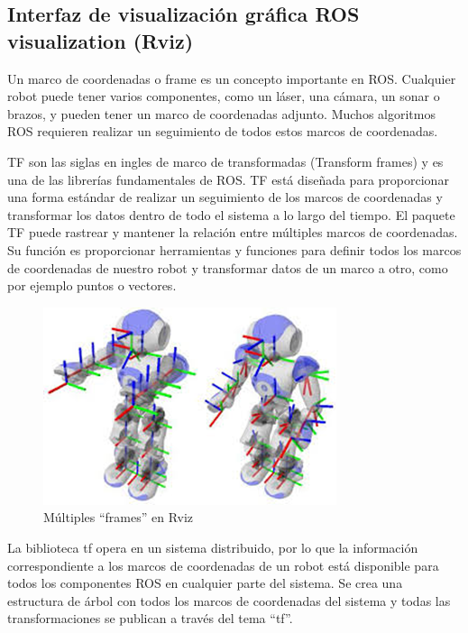         \newpage
    
    \subsection{Interfaz de visualización gráfica ROS visualization (Rviz)}
    
        Un marco de coordenadas o frame es un concepto importante en ROS. Cualquier robot puede tener varios componentes, como un láser, una cámara, un sonar o brazos, y pueden tener un marco de coordenadas adjunto. Muchos algoritmos ROS requieren realizar un seguimiento de todos estos marcos de coordenadas.
        
        TF son las siglas en ingles de marco de transformadas (Transform frames) y es una de las librerías fundamentales de ROS. TF está diseñada para proporcionar una forma estándar de realizar un seguimiento de los marcos de coordenadas y transformar los datos dentro de todo el sistema a lo largo del tiempo. El paquete TF puede rastrear y mantener la relación entre múltiples marcos de coordenadas. Su función es proporcionar herramientas y funciones para definir todos los marcos de coordenadas de nuestro robot y transformar datos de un marco a otro, como por ejemplo puntos o vectores.
        
        \begin{figure}[htb]
            \centering
            \includegraphics[width=0.5\linewidth]{Main/Chapter3/Images3/3-6/ejemplo-multiples-frames-rviz.png}
            \caption{Múltiples ``frames'' en Rviz}
            \label{f:Cap3-6_frames_rviz}
        \end{figure}
        
        La biblioteca tf opera en un sistema distribuido, por lo que la información correspondiente a los marcos de coordenadas de un robot está disponible para todos los componentes ROS en cualquier parte del sistema. Se crea una estructura de árbol con todos los marcos de coordenadas del sistema y todas las transformaciones se publican a través del tema “tf”.
      
